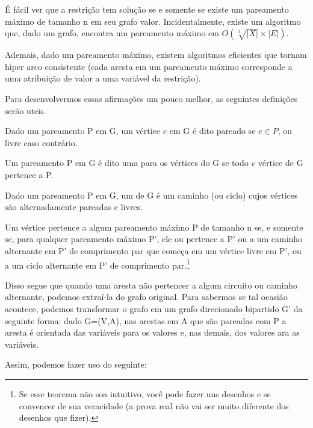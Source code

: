 É fácil ver que a restrição  tem solução se e somente se existe um pareamento máximo de tamanho n em seu grafo valor. Incidentalmente, existe um algoritmo que, dado um grafo, encontra um pareamento máximo em $O(\sqrt[2]{|X|}\times|E|)$.

Ademais, dado um pareamento máximo, existem algoritmos eficientes que tornam  hiper arco consistente (cada aresta em um pareamento máximo corresponde a uma atribuição de valor a uma variável da restrição).

Para desenvolvermos essas afirmações um pouco melhor, as seguintes definições serão uteis.

\begin{definition}
  Dado um pareamento P em G, um vértice $e$ em G é dito pareado se $e\in P$, ou livre caso contrário.
\end{definition}

\begin{definition}
  Um pareamento P em G é dito uma  para os vértices do G se todo $v$ vértice de G pertence a P.
\end{definition}

\begin{definition}
  Dado um pareamento P em G, um  de G é um caminho (ou ciclo) cujos vértices são alternadamente pareadas e livres.
\end{definition}

\begin{theorem}
  Um vértice pertence a algum pareamento máximo P de tamanho n se, e somente se, para qualquer pareamento máximo P', ele ou pertence a P' ou a um caminho alternante em P' de comprimento par que começa em um vértice livre em P', ou a um ciclo alternante
  em P' de comprimento par.\footnote{Se esse teorema não soa intuitivo, você pode fazer uns desenhos e se convencer de sua veracidade (a prova real não vai ser muito diferente dos desenhos que fizer).}
\end{theorem}

Disso segue que quando uma aresta não pertencer a algum circuito ou caminho alternante, podemos extraí-la do grafo original.
Para sabermos se tal ocasião acontece, podemos transformar o grafo em um grafo direcionado bipartido G' da seguinte forma:
dado G=(V,A), nas arestas em A que são pareadas com P a aresta é orientada das variáveis para os valores e, nas demais, dos valores ara as variáveis.

Assim, podemos fazer uso do seguinte:

